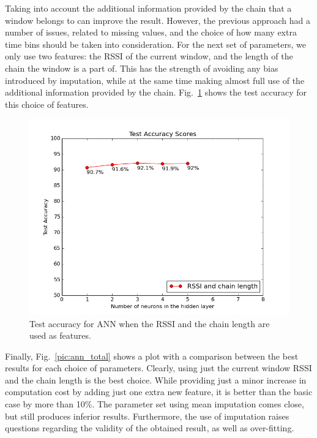 Taking into account the additional information provided by the chain that a window belongs to can improve the result. However, the previous approach had a number of issues, related to missing values, and the choice of how many extra time bins should be taken into consideration. For the next set of parameters, we only use two features: the RSSI of the current window, and the length of the chain the window is a part of. This has the strength of avoiding any bias introduced by imputation, while at the same time making almost full use of the additional information provided by the chain. Fig.~\ref{pic:ann_chain} shows the test accuracy for this choice of features.

\begin{figure}[h]
	\begin{center}
		\includegraphics[scale=0.5]{figures/ann_chain.png}
	\end{center}
	
	\caption{Test accuracy for ANN when the RSSI and the chain length are used as features.}
	\label{pic:ann_chain}

\end{figure}

Finally, Fig.~\ref{pic:ann_total} shows a plot with a comparison between the best results for each choice of parameters. Clearly, using just the current window RSSI and the chain length is the best choice. While providing just a minor increase in computation cost by adding just one extra new feature, it is better than the basic case by more than 10\%. The parameter set using mean imputation comes close, but still produces inferior results. Furthermore, the use of imputation raises questions regarding the validity of the obtained result, as well as over-fitting. 

